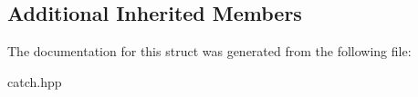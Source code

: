 \subsection*{Additional Inherited Members}


The documentation for this struct was generated from the following file\+:\begin{DoxyCompactItemize}
\item 
catch.\+hpp\end{DoxyCompactItemize}
